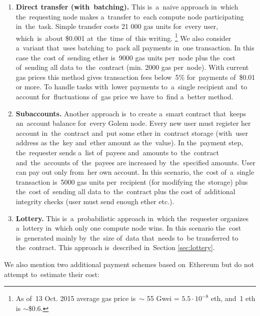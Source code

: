 \documentclass[a4paper]{article}
\begin{document}
    \begin{enumerate}
        \item \textbf{Direct transfer (with~batching).}
        This is~a~naive approach in~which the~requesting node makes a~transfer to~each compute node participating
        in~the~task.
        Simple transfer costs 21 000 gas units for~every user, which~is~about \$0.001 at~the~time of~this writing.
        \footnote{As of~13 Oct. 2015 average gas price is~$\sim$ 55 Gwei = $5.5 \cdot 10^{-8}$ eth, and~1 eth is
        $\sim$\$0.6.}
        We also consider a~variant that~uses batching\cite{BUTERIN} to~pack all payments in~one transaction.
        In this case the~cost of~sending ether is~9000 gas units per~node plus the~cost of~sending all data
        to~the~contract (min. 2000 gas per~node). With current gas prices this method gives transaction fees
        below~5\% for~payments of~\$0.01 or more. To handle tasks with~lower payments to~a~single recipient and~to
        account for~fluctuations of~gas price we have to~find a~better method.
	    \item \textbf{Subaccounts.}
        Another approach is~to create a~smart contract that~keeps an~account balance for~every Golem node.
        Every new user must register her account in~the~contract and~put some ether in~contract storage (with~user
        address as the~key and~ether amount as the~value). In the~payment step, the~requester sends a~list of~payees
        and~amounts to~the~contract and~the~accounts of~the~payees are increased by~the~specified amounts.
        User can pay out only from~her own account. In this scenario, the~cost of~a~single transaction is~5000 gas
        units per~recipient (for modifying the~storage) plus the~cost of~sending all data to~the~contract plus the
        cost of~additional integrity checks (user must send enough ether etc.).
	    \item \textbf{Lottery.}
        This is~a~probabilistic approach in~which the~requester organizes a~lottery in~which only one compute node
        wins. In this scenario the~cost is~generated mainly by~the~size of~data that~needs to~be transferred to
        the~contract. This approach is~described in~Section \ref{sec:lottery}.
    \end{enumerate}

    We also mention two additional payment schemes based on~Ethereum but do not attempt to~estimate their cost:
\end{document}
